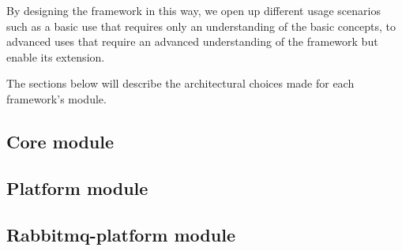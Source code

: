 By designing the framework in this way, we open up different usage scenarios such as a basic use that requires only an understanding of the
basic concepts, to advanced uses that require an advanced understanding of the framework but enable its extension.

The sections below will describe the architectural choices made for each framework's module.

\subsection{Core module}
\label{sec:core-module}

\subsection{Platform module}
\label{sec:platform-module}

\subsection{Rabbitmq-platform module}
\label{sec:rabbitmq-platform-module}